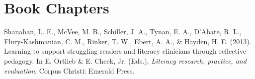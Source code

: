 \section{Book Chapters}
\vspace{-.1275in}
\begin{bibsection}
    \item Shanahan, L. E., McVee, M. B., Schiller, J. A., Tynan, E. A., D'Abate, R. L., Flury-Kashmanian, C. M., Rinker, T. W., Ebert, A. A., \& Hayden, H. E. (2013). Learning to support struggling readers and literacy clinicians through reflective pedagogy. In E. Ortlieb \& E. Cheek, Jr. (Eds.), \emph{Literacy research, practice, and evaluation}. Corpus Christi: Emerald Press.
\end{bibsection}



    


\halfblankline

